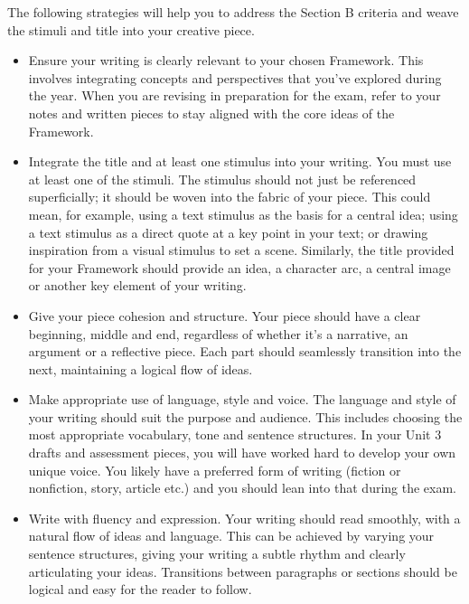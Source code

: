 \documentclass[a4paper]{article}
\begin{document}
The following strategies will help you to address the Section B criteria and weave the stimuli and title into your creative piece.\\

\begin{itemize}
    \item Ensure your writing is clearly relevant to your chosen Framework. This involves integrating concepts and perspectives that you’ve explored during the year. When you are revising in preparation for the exam, refer to your notes and written pieces to stay aligned with the core ideas of the Framework.

\item Integrate the title and at least one stimulus into your writing. You must use at least one of the stimuli. The stimulus should not just be referenced superficially; it should be woven into the fabric of your piece. This could mean, for example, using a text stimulus as the basis for a central idea; using a text stimulus as a direct quote at a key point in your text; or drawing inspiration from a visual stimulus to set a scene. Similarly, the title provided for your Framework should provide an idea, a character arc, a central image or another key element of your writing.

\item Give your piece cohesion and structure. Your piece should have a clear beginning, middle and end, regardless of whether it’s a narrative, an argument or a reflective piece. Each part should seamlessly transition into the next, maintaining a logical flow of ideas.

\item Make appropriate use of language, style and voice. The language and style of your writing should suit the purpose and audience. This includes choosing the most appropriate vocabulary, tone and sentence structures. In your Unit 3 drafts and assessment pieces, you will have worked hard to develop your own unique voice. You likely have a preferred form of writing (fiction or nonfiction, story, article etc.) and you should lean into that during the exam.

\item Write with fluency and expression. Your writing should read smoothly, with a natural flow of ideas and language. This can be achieved by varying your sentence structures, giving your writing a subtle rhythm and clearly articulating your ideas. Transitions between paragraphs or sections should be logical and easy for the reader to follow.
\end{itemize}
\end{document}

